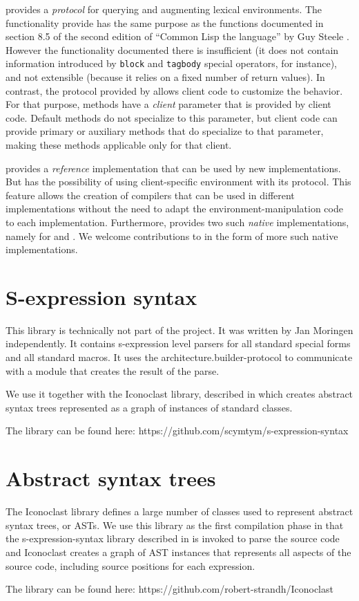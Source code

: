 \trucler{} provides a \clos{} \emph{protocol} for querying and
augmenting lexical environments.  The functionality provide has the
same purpose as the functions documented in section 8.5 of the second
edition of ``Common Lisp the language'' by Guy Steele
\cite{Steele:1990:CLL:95411}.  However the functionality documented
there is insufficient (it does not contain information introduced by
\texttt{block} and \texttt{tagbody} special operators, for instance),
and not extensible (because it relies on a fixed number of return
values).  In contrast, the protocol provided by \trucler{} allows
client code to customize the behavior.  For that purpose, \trucler{}
methods have a \emph{client} parameter that is provided by client
code.  Default \trucler{} methods do not specialize to this parameter,
but client code can provide primary or auxiliary methods that do
specialize to that parameter, making these methods applicable only for
that client.

\trucler{} provides a \emph{reference} implementation that can be used
by new \commonlisp{} implementations.  But \trucler{} has the
possibility of using client-specific environment with its protocol.
This feature allows the creation of compilers that can be used in
different \commonlisp{} implementations without the need to adapt the
environment-manipulation code to each implementation.  Furthermore,
\trucler{} provides two such \emph{native} implementations, namely for
\sbcl{} and \ccl{}.  We welcome contributions to \trucler{} in the
form of more such native implementations.

\section{S-expression syntax}
\label{sec-s-expression-syntax}

This library is technically not part of the \sysname{} project.  It
was written by Jan Moringen independently.  It contains s-expression
level parsers for all standard special forms and all standard macros.
It uses the architecture.builder-protocol to communicate with a module
that creates the result of the parse.

We use it together with the Iconoclast library, described in
 which creates abstract syntax trees represented as
a graph of instances of standard classes.

The library can be found here:
https://github.com/scymtym/s-expression-syntax 

\section{Abstract syntax trees}
\label{sec-ast}

The Iconoclast library defines a large number of classes used to
represent abstract syntax trees, or ASTs.  We use this library as the
first compilation phase in that the s-expression-syntax library
described in  is invoked to parse
the source code and Iconoclast creates a graph of AST instances that
represents all aspects of the source code, including source positions
for each expression.

The library can be found here: https://github.com/robert-strandh/Iconoclast
